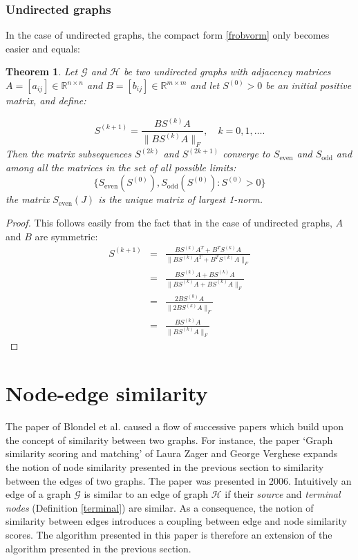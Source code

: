 \documentclass[a4paper,11pt]{report}
\newtheorem{theorem}{Theorem}[section]
\newcommand{\R}{{\mathbb R}}
\newcommand{\graf}{\mathscr{G}}
\newcommand{\grafeen}{\mathscr{H}}
\begin{document}
\subsubsection{Undirected graphs}
In the case of undirected graphs, the compact form \ref{frobvorm} only 
becomes easier and equals:
\begin{theorem}
    Let $\graf$ and $\grafeen$ be two undirected graphs with adjacency matrices $A = [a_{ij}] \in \R^{n\times n}$ 
  and $B = [b_{ij}] \in \R^{m\times m}$ and let $S^{(0)} > 0$ be an initial positive matrix, and 
  define:

  $$S^{(k+1)} = \frac{BS^{(k)}A}{\|BS^{(k)}A\|_F}, \quad k = 
  0,1,\ldots.$$
  Then the matrix subsequences $S^{(2k)}$ and $S^{(2k+1)}$ converge to $S_\text{even}$ 
  and $S_\text{odd}$ and among all the matrices in the set of all possible 
  limits:
  $$\{S_\text{even}(S^{(0)}), S_\text{odd}(S^{(0)}): S^{(0)} > 0 \}$$
  the matrix $S_\text{even}(J)$ is the unique matrix of largest 
  1-norm.

\end{theorem}
\begin{proof}
  This follows easily from the fact that in the case of undirected graphs, $A$ 
  and $B$ are symmetric:
  \begin{eqnarray*}
     S^{(k+1)} &=& \frac{BS^{(k)}A^T + B^TS^{(k)}A}{\|BS^{(k)}A^T + 
     B^TS^{(k)}A\|_F}\\
     &=& \frac{BS^{(k)}A + BS^{(k)}A}{\|BS^{(k)}A + BS^{(k)}A\|_F}\\
     &=& \frac{2BS^{(k)}A}{\|2BS^{(k)}A\|_F}\\
     &=& \frac{BS^{(k)}A}{\|BS^{(k)}A\|_F}
\end{eqnarray*}
  
\end{proof}
\newpage
\section{Node-edge similarity}
The paper of Blondel et al. \cite{blondel} caused a flow of successive papers 
which build upon the concept of similarity between two graphs. For instance, the paper
`Graph similarity scoring and 
matching' of Laura Zager and George Verghese \cite{zager} expands the 
notion of node similarity presented in the previous section to similarity 
between the edges of two graphs. The paper was presented in 2006. Intuitively an 
edge of a graph $\graf$ is similar to an edge of graph $\grafeen$ if their 
\emph{source} and \emph{terminal nodes} (Definition \ref{terminal}) are similar. As a consequence, the notion of similarity between edges
introduces a coupling between edge and node similarity scores. The algorithm presented in 
this paper is therefore an extension of the algorithm presented in the previous section.
\end{document}
